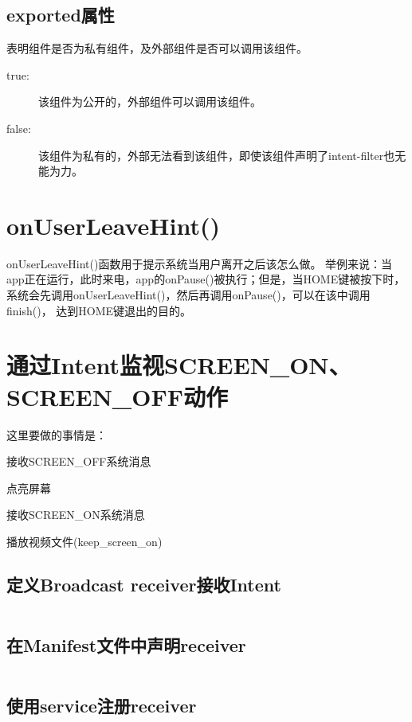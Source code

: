 \subsection[exported属性]{exported属性}
表明组件是否为私有组件，及外部组件是否可以调用该组件。
\begin{description}
  \item[true:] 该组件为公开的，外部组件可以调用该组件。
  \item[false:] 该组件为私有的，外部无法看到该组件，即使该组件声明了intent-filter也无能为力。
\end{description}

\section[onUserLeaveHint()]{onUserLeaveHint()}
onUserLeaveHint()函数用于提示系统当用户离开之后该怎么做。
举例来说：当app正在运行，此时来电，app的onPause()被执行；但是，当HOME键被按下时，
系统会先调用onUserLeaveHint()，然后再调用onPause()，可以在该中调用finish()，
达到HOME键退出的目的。

\section[通过Intent监视SCREEN\_ON、SCREEN\_OFF动作]{通过Intent监视SCREEN\_ON、SCREEN\_OFF动作}
这里要做的事情是：
\begin{coloredenumerate}
  \item 接收SCREEN\_OFF系统消息
  \item 点亮屏幕
  \item 接收SCREEN\_ON系统消息
  \item 播放视频文件(keep\_screen\_on)
\end{coloredenumerate}
\subsection[定义Broadcast receiver接收Intent]{定义Broadcast receiver接收Intent}
\inputminted[linenos,tabsize=4,bgcolor=srcbg,fontsize=\small]{java}{srcdir/ScreenBroadcastReceiver.java}

\subsection[在Manifest文件中声明receiver]{在Manifest文件中声明receiver}
\inputminted[linenos,tabsize=4,bgcolor=srcbg]{xml}{srcdir/AndroidManifest.xml}

\subsection[使用service注册receiver]{使用service注册receiver}
\inputminted[linenos,tabsize=4,bgcolor=srcbg]{java}{srcdir/ReceiverService.java}

